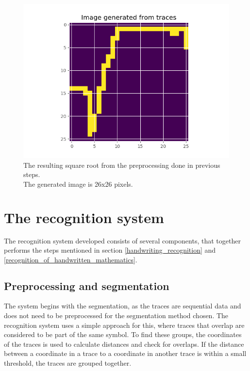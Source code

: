 \begin{figure}[H]
    \centering
    \includegraphics[width=\linewidth,keepaspectratio]{Assets/Chapter3_Method/sqrt_image.png}
    \caption{The resulting square root from the preprocessing done in previous steps.\\The generated image is 26x26 pixels.}
    \label{fig:sqrt_img}
\end{figure}

\section{The recognition system}
\label{the_recognintion_system}
The recognition system developed consists of several components, that together performs the steps mentioned in section \ref{handwriting_recognition} and \ref{recognition_of_handwritten_mathematics}. 



\subsection{Preprocessing and segmentation}
\label{preprocessing_and_segmentation}

The system begins with the segmentation, as the traces are sequential data and does not need to be preprocessed for the segmentation method chosen. The recognition system uses a simple approach for this, where traces that overlap are considered to be part of the same symbol. To find these groups, the coordinates of the traces is used to calculate distances and check for overlaps. If the distance between a coordinate in a trace to a coordinate in another trace is within a small threshold, the traces are grouped together.


